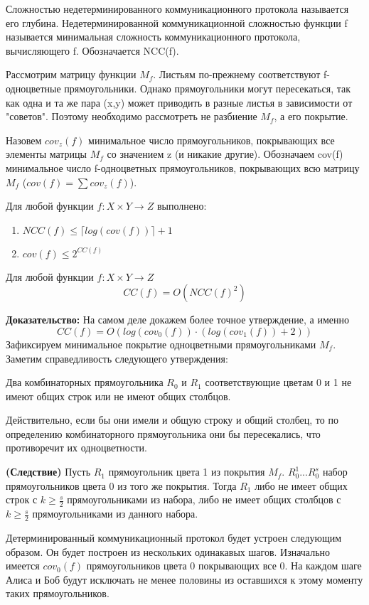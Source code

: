 \documentclass[12pt]{article}
\begin{document}
\begin{Def}
Сложностью недетерминированного коммуникационного протокола называется его глубина.
Недетерминированной коммуникационной сложностью функции f называется минимальная сложность коммуникационного протокола, вычисляющего f. Обозначается NCC(f).
\end{Def}

Рассмотрим матрицу функции $M_f$. Листьям по-прежнему соответствуют f-одноцветные прямоугольники.
Однако прямоугольники могут пересекаться, так как одна и та же пара (x,y) может приводить в разные листья в зависимости от "советов".
Поэтому необходимо рассмотреть не разбиение $M_f$, а его покрытие.

\begin{Def}
Назовем $cov_z(f)$ минимальное число прямоугольников,
покрывающих все элементы матрицы $M_f$ со значением z
(и никакие другие). Обозначаем cov(f) минимальное число f-одноцветных прямоугольников, покрывающих всю
матрицу $M_f$ ($cov(f) = \sum cov_z(f)$).
\end{Def}

\begin{Statement}
Для любой функции $f \colon X \times Y \rightarrow Z$ выполнено:
\begin{enumerate}
    \item
    $NCC(f) \leq \lceil log(cov(f)) \rceil + 1$
    \item
    $cov(f) \leq 2^{CC(f)}$
\end{enumerate}
\end{Statement}

\begin{Th}
    Для любой функции $f \colon X \times Y \rightarrow Z$
    $$CC(f) = O(NCC(f)^2)$$
\end{Th}
\textbf{Доказательство:}
На самом деле докажем более точное утверждение, а именно
$$ CC(f)=O(log(cov_0(f)) \cdot (log(cov_1(f))+2))$$
Зафиксируем минимальное покрытие одноцветными прямоугольниками $M_f$.
Заметим справедливость следующего утверждения:
\begin{Statement}
    Два комбинаторных прямоугольника $R_0$ и $R_1$ соответствующие цветам 0 и 1 не имеют общих строк или не имеют общих столбцов.
\end{Statement}
Действительно, если бы они имели и общую строку и общий столбец,
то по определению комбинаторного прямоугольника они бы пересекались, что противоречит их одноцветности.
\begin{Statement}
    \textbf{(Следствие)}
    Пусть $R_1$ прямоугольник цвета 1 из покрытия $M_f$.
    $R_0^1...R_0^s$ набор прямоугольников цвета 0 из того же покрытия. Тогда $R_1$ либо не имеет общих строк с
    $k \geq \frac{s}{2}$ прямоугольниками из набора,
    либо не имеет общих столбцов с $k \geq \frac{s}{2}$
    прямоугольниками из данного набора.
\end{Statement}
Детерминированный коммуникационный протокол будет устроен следующим образом.
Он будет построен из нескольких одинакавых шагов.
Изначально имеется $cov_0(f)$
прямоугольников цвета 0 покрывающих все 0.
На каждом шаге Алиса и Боб будут исключать не менее половины из
оставшихся к этому моменту таких прямоугольников.
\end{document}
